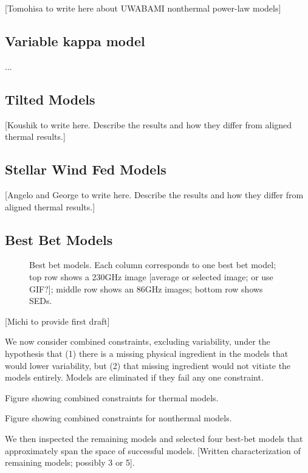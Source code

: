 [Tomohisa to write here about UWABAMI nonthermal power-law models]



\subsection{Variable kappa model}
...  


\subsection{Tilted Models}

[Koushik to write here.  Describe the results and how they differ from aligned thermal results.]


\subsection{Stellar Wind Fed Models}

[Angelo and George to write here.  Describe the results and how they differ from aligned thermal results.]


\subsection{Best Bet Models}

\begin{figure}
    \caption{Best bet models.  Each column corresponds to one best bet model; top row shows a 230GHz image [average or selected image; or use GIF?]; middle row shows an 86GHz images; bottom row shows SEDs.}
    \label{fig:my_label}
\end{figure}

[Michi to provide first draft]

We now consider combined constraints, excluding variability, under the hypothesis that (1) there is a missing physical ingredient in the models that would lower variability, but (2) that missing ingredient would not vitiate the models entirely.  Models are eliminated if they fail any one constraint.

Figure showing combined constraints for thermal models.

Figure showing combined constraints for nonthermal models.

We then inspected the remaining models and selected four best-bet models that approximately span the space of successful models.  [Written characterization of remaining models; possibly 3 or 5].
